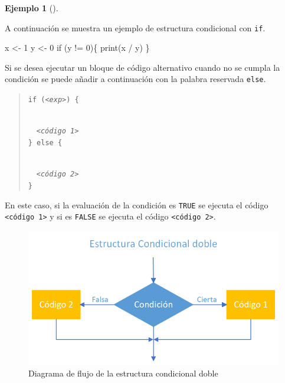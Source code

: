 \documentclass[
  a4paper,
]{scrreport}
\newenvironment{Shaded}{\begin{snugshade}}{\end{snugshade}}
\newcommand{\ControlFlowTok}[1]{\textcolor[rgb]{0.00,0.23,0.31}{#1}}
\newcommand{\DecValTok}[1]{\textcolor[rgb]{0.68,0.00,0.00}{#1}}
\newcommand{\FunctionTok}[1]{\textcolor[rgb]{0.28,0.35,0.67}{#1}}
\newcommand{\NormalTok}[1]{\textcolor[rgb]{0.00,0.23,0.31}{#1}}
\newcommand{\OtherTok}[1]{\textcolor[rgb]{0.00,0.23,0.31}{#1}}
\newcommand{\SpecialCharTok}[1]{\textcolor[rgb]{0.37,0.37,0.37}{#1}}
\theoremstyle{definition}
\theoremstyle{definition}
\newtheorem{example}{Ejemplo}[chapter]
\theoremstyle{remark}
\begin{document}
\leavevmode{}%
\begin{example}[]\label{exm-condicional-simple}

A continuación se muestra un ejemplo de estructura condicional con
\texttt{if}.

\begin{Shaded}
\begin{Highlighting}[]
\NormalTok{x }\OtherTok{\textless{}{-}} \DecValTok{1}
\NormalTok{y }\OtherTok{\textless{}{-}} \DecValTok{0}
\ControlFlowTok{if}\NormalTok{ (y }\SpecialCharTok{!=} \DecValTok{0}\NormalTok{)\{}
  \FunctionTok{print}\NormalTok{(x }\SpecialCharTok{/}\NormalTok{ y)}
\NormalTok{\}}
\end{Highlighting}
\end{Shaded}

\end{example}

Si se desea ejecutar un bloque de código alternativo cuando no se cumpla
la condición se puede añadir a continuación con la palabra reservada
\texttt{else}.

\begin{quote}
\texttt{if\ (}\emph{\texttt{\textless{}exp\textgreater{}}}\texttt{)\ \{}\strut \\
  \emph{\texttt{\textless{}código\ 1\textgreater{}}}\\
\texttt{\}\ else\ \{}\strut \\
  \emph{\texttt{\textless{}código\ 2\textgreater{}}}\\
\texttt{\}}
\end{quote}

En este caso, si la evaluación de la condición es \texttt{TRUE} se
ejecuta el código \texttt{\textless{}código\ 1\textgreater{}} y si es
\texttt{FALSE} se ejecuta el código
\texttt{\textless{}código\ 2\textgreater{}}.

\begin{figure}

{\centering \includegraphics{./img/04-estructuras-control/condicional-doble.png}

}

\caption{Diagrama de flujo de la estructura condicional doble}

\end{figure}
\end{document}
